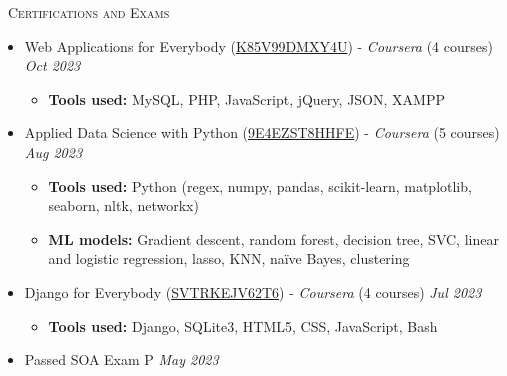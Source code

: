 \documentclass[a4paper,11pt]{article}
\newcommand{\header} [1] {
    \vspace{1mm}
    {\textsc{\large{\xrfill[0.5ex]{0.5pt}~#1~\xrfill[0.5ex]{0.5pt}}}} %
}
\begin{document}
\header{Certifications and Exams} \\
\vspace{1mm}
\begin{itemize}
    \item Web Applications for Everybody (\href{https://www.coursera.org/account/accomplishments/specialization/K85V99DMXY4U}{K85V99DMXY4U}) - \emph{Coursera} (4 courses) \hfill \emph{Oct 2023}
    \begin{itemize}
        \item \textbf{Tools used:} MySQL, PHP, JavaScript, jQuery, JSON, XAMPP
    \end{itemize}
    \item Applied Data Science with Python (\href{https://www.coursera.org/account/accomplishments/specialization/9E4EZST8HHFE}{9E4EZST8HHFE}) - \emph{Coursera} (5 courses) \hfill \emph{Aug 2023}
    \begin{itemize}
        \item \textbf{Tools used:} Python (regex, numpy, pandas, scikit-learn, matplotlib, seaborn, nltk, networkx)
        \item \textbf{ML models:} Gradient descent, random forest, decision tree, SVC, linear and logistic regression, lasso, KNN, na\"{i}ve Bayes, clustering
    \end{itemize}
    \item Django for Everybody (\href{https://www.coursera.org/account/accomplishments/specialization/SVTRKEJV62T6}{SVTRKEJV62T6}) - \emph{Coursera} (4 courses) \hfill \emph{Jul 2023}
    \begin{itemize}
        \item \textbf{Tools used:} Django, SQLite3, HTML5, CSS, JavaScript, Bash
    \end{itemize}
    \item Passed SOA Exam P \hfill \emph{May 2023}
\end{itemize}
\vspace{1mm}


\end{document}
